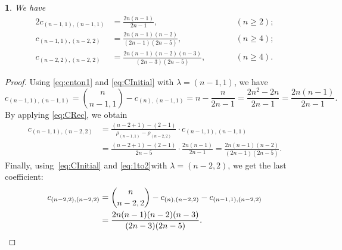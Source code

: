 \documentclass[smallextended]{svjour3}
\newtheorem{thm}{\protect\theoremname}
\providecommand{\theoremname}{Theorem}
\begin{document}
\begin{thm}
\label{thm:fam1}
We have
\begin{alignat*}{2}
  c_{(n-1,1),(n-1,1)} &= \frac{2n(n-1)}{2n-1}, &\qquad& (n\geq2); \\
  c_{(n-1,1),(n-2,2)} &= \frac{2n(n-1)(n-2)}{(2n-1)(2n-5)}, && (n\geq4); \\
  c_{(n-2,2),(n-2,2)} &= \frac{2n(n-1)(n-2)(n-3)}{(2n-3)(2n-5)}, &&(n\geq4).
\end{alignat*}
\end{thm}
\begin{proof}
Using \eqref{eq:cnton1} and  \eqref{eq:CInitial} with $\lambda=(n-1,1)$, we have
\[
  c_{(n-1,1),(n-1,1)}=\binom{n}{n-1,1}-c_{(n),(n-1,1)}=n-\frac{n}{2n-1}=\frac{2n^{2}-2n}{2n-1}=\frac{2n\left(n-1\right)}{2n-1}.
\]
By applying \eqref{eq:CRec}, we obtain
\begin{align*}
  c_{(n-1,1),(n-2,2)}
  &= \frac{(n-2+1)-(2-1)}{\rho_{(n-1,1)}-\rho_{(n-2,2)}}\cdot c_{(n-1,1),(n-1,1)}\\
  &= \frac{(n-2+1)-(2-1)}{2n-5}\cdot\frac{2n(n-1)}{2n-1}= \frac{2n(n-1)(n-2)}{(2n-1)(2n-5)}.
\end{align*}
Finally, using~\eqref{eq:CInitial} and \eqref{eq:1to2}with $\lambda=(n-2,2)$, we get the last coefficient:
\begin{align*}
 c_{(n-2,2),(n-2,2)}&=\binom{n}{n-2,2}-c_{(n),(n-2,2)}-c_{(n-1,1),(n-2,2)}\\
&=\frac{2n(n-1)(n-2)(n-3)}{(2n-3)(2n-5)}. \hspace*{\fill} 
\end{align*}
\end{proof}
\end{document}
